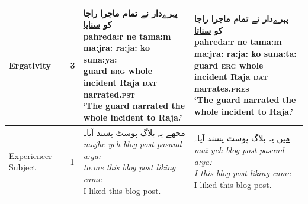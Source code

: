 \documentclass[11pt]{article}
\begin{document}
\begin{table}[ht!]
{\begin{tabular}{llp{9cm}p{9cm}}
 Ergativity & 3 & \parbox[t]{9cm}{  \foreignlanguage{arabic}{پہرے‌دار نے تمام ماجرا راجا کو \underline{سنایا}} \\
   pahreda:r \quad ne \quad tama:m \quad ma:jra: \quad ra:ja: \quad ko \quad suna:ya: \\
   guard \quad \textsc{erg} \quad whole \quad incident \quad Raja \quad \textsc{dat} \quad narrated.\textsc{pst} \\
   `The guard narrated the whole incident to Raja.' \\ }
    &  \parbox[t]{9cm}{  \foreignlanguage{arabic}{پہرے‌دار نے تمام ماجرا راجا کو \underline{سناتا}} \\
   pahreda:r \quad ne \quad tama:m \quad ma:jra: \quad ra:ja: \quad ko \quad suna:ta: \\
   guard \quad \textsc{erg} \quad whole \quad incident \quad Raja \quad \textsc{dat} \quad narrates.\textsc{pres} \\
   `The guard narrated the whole incident to Raja.' \\ }\\ \hline

   Experiencer Subject & 1 & \parbox[t]{9cm}{

\foreignlanguage{arabic}{ \underline{مجھے} یہ بلاگ پوسٹ پسند آیا۔} \\
\textit{mujhe yeh blog post pasand a:ya:} \\
\textit{to.me this blog post liking came} \\
I liked this blog post.

} & \parbox[t]{9cm}{\foreignlanguage{arabic}{ \underline{میں} یہ بلاگ پوسٹ پسند آیا۔ } \\
\textit{maĩ yeh blog post pasand a:ya:} \\
\textit{I this blog post liking came} \\
I liked this blog post.} \\ \hline


\end{tabular}}
\end{table}
\end{document}

